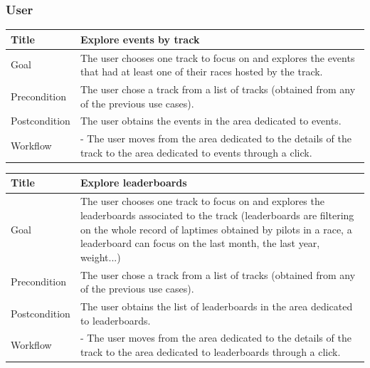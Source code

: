 \documentclass{beamer}
\begin{document}
\begin{frame}
    \frametitle{User}
    \begin{table}
        \tiny
        \begin{tabular}{|p{2cm}|p{6cm}|}
        \hline
        Title & \textbf{Explore events by track} \\
        \hline
        Goal & The user chooses one track to focus on and explores the events that had at least one
        of their races hosted by the track. \\
        \hline
        Precondition & The user chose a track from a list of tracks (obtained from any of the previous use cases).\\
        \hline
        Postcondition & The user obtains the events in the area dedicated to events. \\
        \hline
        Workflow &
        - The user moves from the area dedicated to the details of the track to the
        area dedicated to events through a click. \\
        \hline
        \end{tabular}
\end{table}

\begin{table}
    \tiny
    \begin{tabular}{|p{2cm}|p{6cm}|}
    \hline
    Title & \textbf{Explore leaderboards} \\
    \hline
    Goal & The user chooses one track to focus on and explores the leaderboards associated
    to the track (leaderboards are filtering on the whole record of laptimes obtained by pilots in a race,
    a leaderboard can focus on the last month, the last year, weight...) \\
    \hline
    Precondition & The user chose a track from a list of tracks (obtained from any of the previous use cases).\\
    \hline
    Postcondition & The user obtains the list of leaderboards in the area dedicated to leaderboards. \\
    \hline
    Workflow &
    - The user moves from the area dedicated to the details of the track to the
    area dedicated to leaderboards through a click. \\
    \hline
    \end{tabular}
\end{table}
\end{frame}

\end{document}
